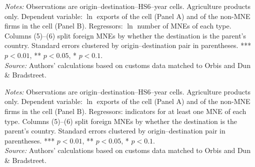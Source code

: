 \documentclass[11pt,a4paper]{article}
\begin{document}
\begin{table}[H]\centering\small%
  \caption{Agriculture: Multinational Presence and Exports: Intensive Margin, by Type of Multinational}%
  \label{tab:cnt_agro}%
  \par\vspace{3pt}%
  \begin{minipage}{0.95\textwidth}\footnotesize %
  \textit{Notes:} Observations are origin--destination--HS6--year cells. Agriculture products only. Dependent variable: $\ln$ exports of the cell (Panel A) and of the non-MNE firms in the cell (Panel B). Regressors: $\ln$ number of MNEs of each type. Columns (5)--(6) split foreign MNEs by whether the destination is the parent's country. Standard errors clustered by origin--destination pair in parentheses. *** $p<0.01$, ** $p<0.05$, * $p<0.1$.\\[3pt]%
  \textit{Source:} Authors' calculations based on customs data matched to Orbis and Dun \& Bradstreet.%
  \end{minipage}%
  \end{table}
\begin{table}[H]\centering\small%
  \caption{Agriculture: Multinational Presence and Exports: Extensive Margin, by Type of Multinational}%
  \label{tab:ext_agro}%
  \par\vspace{3pt}%
  \begin{minipage}{0.95\textwidth}\footnotesize %
  \textit{Notes:} Observations are origin--destination--HS6--year cells. Agriculture products only. Dependent variable: $\ln$ exports of the cell (Panel A) and of the non-MNE firms in the cell (Panel B). Regressors: indicators for at least one MNE of each type. Columns (5)--(6) split foreign MNEs by whether the destination is the parent's country. Standard errors clustered by origin--destination pair in parentheses. *** $p<0.01$, ** $p<0.05$, * $p<0.1$.\\[3pt]%
  \textit{Source:} Authors' calculations based on customs data matched to Orbis and Dun \& Bradstreet.%
  \end{minipage}%
  \end{table}
\end{document}
